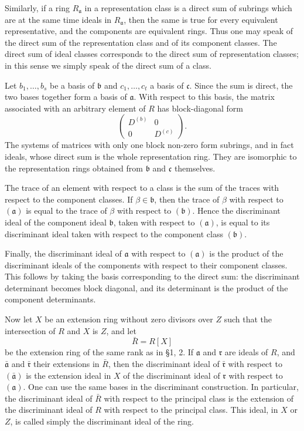 \documentclass[11pt]{article}
\begin{document}
Similarly, if a ring \(R_{\mathfrak a}\) in a representation class is a
direct sum of subrings which are at the same time ideals in
\(R_{\mathfrak a}\), then the same is true for every equivalent
representative, and the components are equivalent rings. Thus one may
speak of the direct sum of the representation class and of its component
classes. The direct sum of ideal classes corresponds to the direct sum
of representation classes; in this sense we simply speak of the direct
sum of a class.

Let \(b_1,
\ldots,b_s\) be a basis of \(\mathfrak b\) and \(c_1,
\ldots,c_t\) a basis of \(\mathfrak c\). Since the sum is direct, the
two bases together form a basis of \(\mathfrak a\). With respect to this
basis, the matrix associated with an arbitrary element of \(R\) has
block-diagonal form \[
  \begin{pmatrix}D^{(b)}&0\\0&D^{(c)}\end{pmatrix}.
\] The systems of matrices with only one block non-zero form subrings,
and in fact ideals, whose direct sum is the whole representation ring.
They are isomorphic to the representation rings obtained from
\(\mathfrak b\) and \(\mathfrak c\) themselves.

The trace of an element with respect to a class is the sum of the traces
with respect to the component classes. If \(\beta\in\mathfrak b\), then
the trace of \(\beta\) with respect to \((\mathfrak a)\) is equal to the
trace of \(\beta\) with respect to \((\mathfrak b)\). Hence the
discriminant ideal of the component ideal \(\mathfrak b\), taken with
respect to \((\mathfrak a)\), is equal to its discriminant ideal taken
with respect to the component class \((\mathfrak b)\).

Finally, the discriminant ideal of \(\mathfrak a\) with respect to
\((\mathfrak a)\) is the product of the discriminant ideals of the
components with respect to their component classes. This follows by
taking the basis corresponding to the direct sum: the discriminant
determinant becomes block diagonal, and its determinant is the product
of the component determinants.

Now let \(X\) be an extension ring without zero divisors over \(Z\) such
that the intersection of \(R\) and \(X\) is \(Z\), and let \[
  \bar R=R[X]
\] be the extension ring of the same rank as in §1, 2. If
\(\mathfrak a\) and \(\mathfrak r\) are ideals of \(R\), and
\(\bar{\mathfrak a}\) and \(\bar{\mathfrak r}\) their extensions in
\(\bar R\), then the discriminant ideal of \(\bar{\mathfrak r}\) with
respect to \((\bar{\mathfrak a})\) is the extension ideal in \(X\) of
the discriminant ideal of \(\mathfrak r\) with respect to
\((\mathfrak a)\). One can use the same bases in the discriminant
construction. In particular, the discriminant ideal of \(\bar R\) with
respect to the principal class is the extension of the discriminant
ideal of \(R\) with respect to the principal class. This ideal, in \(X\)
or \(Z\), is called simply the discriminant ideal of the ring.
\end{document}
